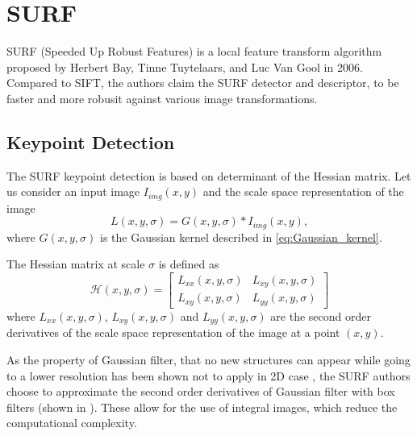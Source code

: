 \section{SURF}
SURF (Speeded Up Robust Features) is a local feature transform algorithm proposed by Herbert Bay, Tinne Tuytelaars, and Luc Van Gool in 2006\cite{Bay2006}. Compared to SIFT\cite{Lowe1999}, the authors claim the SURF detector and descriptor, to be faster and more robusit against various image transformations.

\subsection{Keypoint Detection}
The SURF keypoint detection is based on determinant of the Hessian matrix. Let us consider an input image $I_{img}(x,y)$ and the scale space representation of the image
\begin{equation}
    L(x, y,\sigma) =  G(x,y,\sigma)*I_{img}(x,y),
\end{equation}
where $G(x,y,\sigma)$ is the Gaussian kernel described in \eqref{eq:Gaussian_kernel}.

The Hessian matrix at scale $\sigma$ is defined as
\begin{equation}
    \mathcal{H}(x, y, \sigma) =
    \begin{bmatrix}
        L_{xx}(x, y, \sigma) & L_{xy}(x, y, \sigma)\\
        L_{xy}(x, y, \sigma) & L_{yy}(x, y, \sigma)
    \end{bmatrix}
\end{equation}
where $L_{xx}(x, y, \sigma)$, $L_{xy}(x, y, \sigma)$ and $L_{yy}(x, y, \sigma)$ are the second order derivatives of the scale space representation of the image at a point $(x, y)$.

As the property of Gaussian filter, that no new structures can appear while going to a lower resolution has been shown not to apply in 2D case \cite{Koenderink1984}, the SURF authors choose to approximate the second order derivatives of Gaussian filter with box filters (shown in ). These allow for the use of integral images, which reduce the computational complexity.

